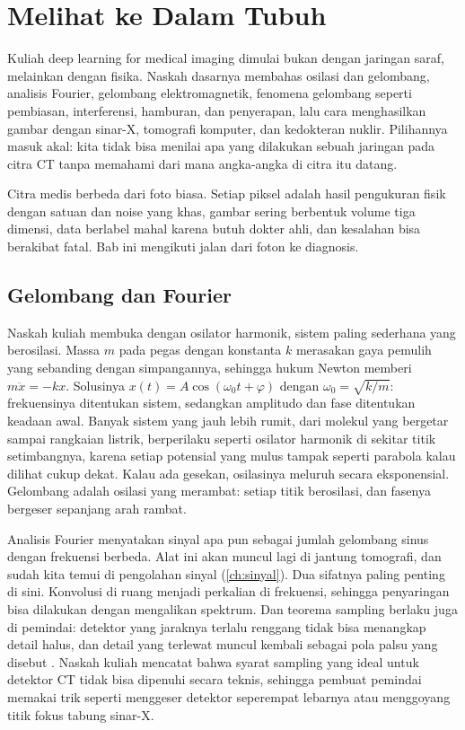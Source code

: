 \chapter{Melihat ke Dalam Tubuh}
\label{ch:medis}

Kuliah deep learning for medical imaging dimulai bukan dengan jaringan saraf, melainkan dengan fisika.
Naskah dasarnya membahas osilasi dan gelombang, analisis Fourier, gelombang elektromagnetik, fenomena
gelombang seperti pembiasan, interferensi, hamburan, dan penyerapan, lalu cara menghasilkan gambar
dengan sinar-X, tomografi komputer, dan kedokteran nuklir. Pilihannya masuk akal: kita tidak bisa
menilai apa yang dilakukan sebuah jaringan pada citra CT tanpa memahami dari mana angka-angka di
citra itu datang.

Citra medis berbeda dari foto biasa. Setiap piksel adalah hasil pengukuran fisik dengan satuan dan
noise yang khas, gambar sering berbentuk volume tiga dimensi, data berlabel mahal karena butuh dokter
ahli, dan kesalahan bisa berakibat fatal. Bab ini mengikuti jalan dari foton ke diagnosis.

\section{Gelombang dan Fourier}

Naskah kuliah membuka dengan osilator harmonik, sistem paling sederhana yang berosilasi. Massa $m$ pada
pegas dengan konstanta $k$ merasakan gaya pemulih yang sebanding dengan simpangannya, sehingga hukum Newton
memberi $m\ddot x=-kx$. Solusinya $x(t)=A\cos(\omega_0t+\varphi)$ dengan $\omega_0=\sqrt{k/m}$: frekuensinya
ditentukan sistem, sedangkan amplitudo dan fase ditentukan keadaan awal. Banyak sistem yang jauh lebih rumit,
dari molekul yang bergetar sampai rangkaian listrik, berperilaku seperti osilator harmonik di sekitar titik
setimbangnya, karena setiap potensial yang mulus tampak seperti parabola kalau dilihat cukup dekat. Kalau ada
gesekan, osilasinya meluruh secara eksponensial. Gelombang adalah osilasi yang merambat: setiap titik
berosilasi, dan fasenya bergeser sepanjang arah rambat.

Analisis Fourier menyatakan sinyal apa pun sebagai jumlah gelombang sinus dengan frekuensi berbeda. Alat ini
akan muncul lagi di jantung tomografi, dan sudah kita temui di pengolahan sinyal (\cref{ch:sinyal}). Dua sifatnya
paling penting di sini. Konvolusi di ruang menjadi perkalian di frekuensi, sehingga penyaringan bisa dilakukan
dengan mengalikan spektrum. Dan teorema sampling berlaku juga di pemindai: detektor yang jaraknya terlalu
renggang tidak bisa menangkap detail halus, dan detail yang terlewat muncul kembali sebagai pola palsu yang
disebut . Naskah kuliah mencatat bahwa syarat sampling yang ideal untuk detektor CT tidak bisa
dipenuhi secara teknis, sehingga pembuat pemindai memakai trik seperti menggeser detektor seperempat lebarnya
atau menggoyang titik fokus tabung sinar-X.

